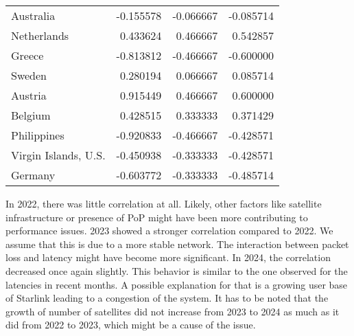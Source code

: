 \begin{table}
\begin{tabular}{lrrr}
		Australia            & -0.155578           & -0.066667           & -0.085714            \\
		Netherlands          & 0.433624            & 0.466667            & 0.542857             \\
		Greece               & -0.813812           & -0.466667           & -0.600000            \\
		Sweden               & 0.280194            & 0.066667            & 0.085714             \\
		Austria              & 0.915449            & 0.466667            & 0.600000             \\
		Belgium              & 0.428515            & 0.333333            & 0.371429             \\
		Philippines          & -0.920833           & -0.466667           & -0.428571            \\
		Virgin Islands, U.S. & -0.450938           & -0.333333           & -0.428571            \\
		Germany              & -0.603772           & -0.333333           & -0.485714            \\
		\bottomrule
	\end{tabular}
\end{table}

In 2022, there was little correlation at all. Likely, other factors like satellite infrastructure or presence of \ac{PoP} might have been more contributing to performance issues.
2023 showed a stronger correlation compared to 2022. We assume that this is due to a more stable network. The interaction between packet loss and latency might have become more significant.
In 2024, the correlation decreased once again slightly. This behavior is similar to the one observed for the latencies in recent months. A possible explanation for that is a growing user base of Starlink leading to a congestion of the system. It has to be noted that the growth of number of satellites did not increase from 2023 to 2024 as much as it did from 2022 to 2023, which might be a cause of the issue.

